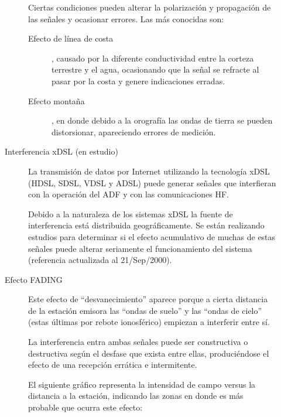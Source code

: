 \begin{description}
\begin{description}
Ciertas condiciones pueden alterar la polarizaci\'on y propagaci\'on de las se\~nales y ocasionar errores. Las m\'as conocidas son:

\begin{description}
\item [Efecto de l\'inea de costa], causado por la diferente conductividad entre la corteza terrestre y el agua, ocasionando que la se\~nal se refracte al pasar por la costa y genere indicaciones erradas.


\item [Efecto monta\~na], en donde debido a la orograf\'ia las ondas de tierra se pueden distorsionar, apareciendo errores de medici\'on.

\end{description}


\item [Interferencia xDSL (en estudio)]

La transmisi\'on de datos por Internet utilizando la tecnolog\'ia xDSL (HDSL, SDSL, VDSL y ADSL) puede generar se\~nales que interfieran con la operaci\'on del ADF y con las comunicaciones HF.

Debido a la naturaleza de los sistemas xDSL la fuente de interferencia est\'a distribuida geogr\'aficamente. Se est\'an realizando estudios para determinar si el efecto acumulativo de muchas de estas se\~nales puede alterar seriamente el funcionamiento del sistema (referencia actualizada al 21/Sep/2000).


\item [Efecto FADING]

Este efecto de ``desvanecimiento'' aparece porque a cierta distancia de la estaci\'on emisora las ``ondas de suelo'' y las ``ondas de cielo'' (estas \'ultimas por rebote ionosf\'erico) empiezan a interferir entre s\'i.

La interferencia entra ambas se\~nales puede ser constructiva o destructiva seg\'un el desfase que exista entre ellas, produci\'endose el efecto de una recepci\'on err\'atica e intermitente.

El siguiente gr\'afico representa la intensidad de campo versus la distancia a la estaci\'on, indicando las zonas en donde es m\'as probable que ocurra este efecto:


\end{description}
\end{description}

